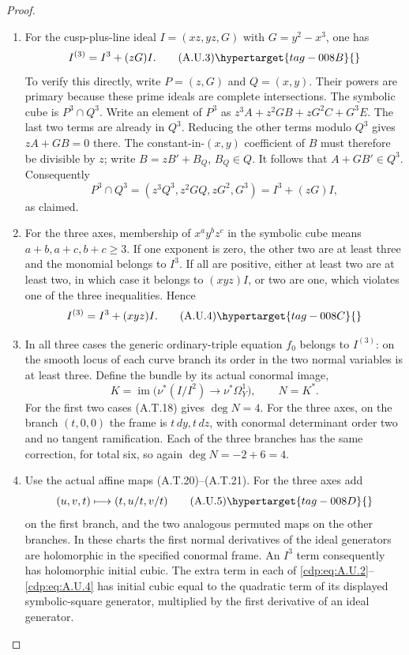 \begin{proof}
\begin{enumerate}[label={$\langle1\rangle$\arabic*.},leftmargin=*]
\item For the cusp-plus-line ideal $I=(xz,yz,G)$ with
$G=y^2-x^3$, one has
\[
                   I^{(3)}=I^3+(zG)I.             \tag{A.U.3}\hypertarget{tag-008B}{}\label{cdp:eq:A.U.3}
\]
To verify this directly, write $P=(z,G)$ and
$Q=(x,y)$. Their powers are primary because these
prime ideals are complete intersections. The
symbolic cube is $P^3\cap Q^3$.
Write an element of $P^3$ as
$z^3A+z^2GB+zG^2C+G^3E$.
The last two terms are already in $Q^3$.
Reducing the other terms modulo $Q^3$ gives
$zA+GB=0$ there. The constant-in-$(x,y)$ coefficient
of $B$ must therefore be divisible by $z$; write
$B=zB'+B_Q$, $B_Q\in Q$.
It follows that $A+GB'\in Q^3$.
Consequently
\[
 P^3\cap Q^3=(z^3Q^3,z^2GQ,zG^2,G^3)
                        =I^3+(zG)I,
\]
as claimed.

\item For the three axes, membership of
$x^a y^b z^c$ in the symbolic cube means
$a+b,a+c,b+c\ge3$.
If one exponent is zero, the other two are at
least three and the monomial belongs to $I^3$.
If all are positive, either at least two are at
least two, in which case it belongs to $(xyz)I$,
or two are one, which violates one of the three
inequalities. Hence
\[
                         I^{(3)}=I^3+(xyz)I.       \tag{A.U.4}\hypertarget{tag-008C}{}\label{cdp:eq:A.U.4}
\]

\item In all three cases the generic ordinary-triple
equation $f_0$ belongs to $I^{(3)}$: on the smooth
locus of each curve branch its order in the two
normal variables is at least three. Define the
bundle by its actual conormal image,
\[
 K=\operatorname{im}\bigl(\nu^*(I/I^2)
                           \to\nu^*\Omega_Y^1\bigr),
 \qquad N=K^*.
\]
For the first two cases (A.T.18) gives $\deg N=4$.
For the three axes, on the branch $(t,0,0)$ the
frame is $t\,dy,t\,dz$, with conormal determinant
order two and no tangent ramification. Each of the
three branches has the same correction, for total
six, so again $\deg N=-2+6=4$.

\item Use the actual affine maps (A.T.20)--(A.T.21).
For the three axes add
\[
              (u,v,t)\longmapsto(t,u/t,v/t)
                                                        \tag{A.U.5}\hypertarget{tag-008D}{}\label{cdp:eq:A.U.5}
\]
on the first branch, and the two analogous permuted
maps on the other branches. In these charts the
first normal derivatives of the ideal generators
are holomorphic in the specified conormal frame.
An $I^3$ term consequently has holomorphic initial
cubic. The extra term in each of \eqref{cdp:eq:A.U.2}--\eqref{cdp:eq:A.U.4}
has initial cubic equal to the quadratic term of
its displayed symbolic-square generator, multiplied
by the first derivative of an ideal generator.


\end{enumerate}
\end{proof}
